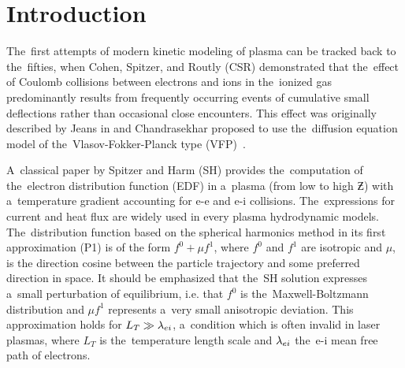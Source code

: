 \section{Introduction}
\label{sec:Intro}

The~first attempts of modern kinetic modeling of plasma can be tracked back 
to the~fifties, when Cohen, Spitzer, and Routly (CSR) \cite{CSR_1950} 
demonstrated that the~effect of Coulomb collisions between electrons and ions 
in the~ionized gas predominantly results 
from frequently occurring events of cumulative small deflections 
rather than occasional close encounters. This effect was originally described
by Jeans in \cite{Jeans_BOOK1929} and 
Chandrasekhar \cite{Chandrasekhar_RMP1943} 
proposed to use the~diffusion equation model of the~Vlasov-Fokker-Planck type 
(VFP)~\cite{Planck_1917}.

A~classical paper by Spitzer and Harm (SH) 
\cite{SpitzerHarm_PR1953} provides the~computation of 
the~electron distribution function (EDF) in a~plasma (from low to high $\Zbar$)
with a~temperature gradient accounting for e-e and e-i collisions.
The~expressions for current and heat flux are widely used in every plasma 
hydrodynamic models.
The~distribution function based on the spherical harmonics method in 
its first approximation (P1) \cite{Jeans_MNRAS1917} is of the form 
$f^0+\mu f^1$, where $f^0$ and $f^1$ 
are isotropic and $\mu$, is the direction cosine between the particle 
trajectory and some preferred direction in space. It should be emphasized that
the~SH solution expresses a~small perturbation of equilibrium, i.e. that 
$f^0$ is the~Maxwell-Boltzmann distribution and $\mu f^1$ represents 
a~very small anisotropic deviation. 
This approximation holds for $L_T\gg\lambda_{ei}$, 
a~condition which is often invalid in laser plasmas, 
where $L_T$ is the~temperature length scale and $\lambda_{ei}$ the~e-i 
mean free path of electrons.%

